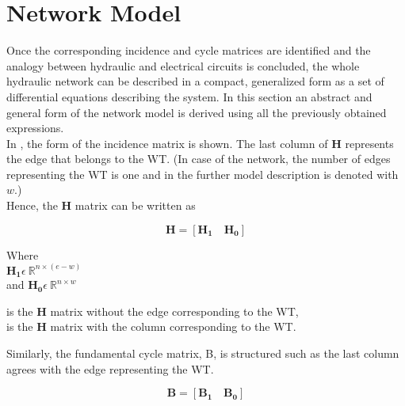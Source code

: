 \section{Network Model}  
\label{ParameterEstimation}
Once the corresponding incidence and cycle matrices are identified and the analogy between hydraulic and electrical circuits is concluded, the whole hydraulic network can be described in a compact, generalized form as a set of differential equations describing the system. In this section an abstract and general form of the network model is derived using all the previously obtained expressions. 
\\
In , the form of the incidence matrix is shown. The last column of $\pmb{H}$ represents the edge that belongs to the WT. (In case of the network, the number of edges representing the WT is one and in the further model description is denoted with $w$.) 
\\
Hence, the $\pmb{H}$ matrix can be written as 

\begin {equation}
\pmb{H} = [\pmb{H_1} \quad \pmb{H_0}]
\label{Hmatrix}
\end{equation}

\begin{minipage}[t]{0.18\textwidth}
Where\\
\hspace*{8mm} $\pmb{H_1} \epsilon \: \mathbb{R}^{n \times (e-w)}$  \\
and \hspace*{0.4mm} $\pmb{H_0} \epsilon \: \mathbb{R}^{n \times w} $ 
\end{minipage}
\begin{minipage}[t]{0.70\textwidth}
\vspace*{2mm}
\hspace*{4mm} is the $\pmb{H}$ matrix without the edge corresponding to the WT,\\
\hspace*{4mm} is the $\pmb{H}$ matrix with the column corresponding to the WT. 
\end{minipage}

Similarly, the fundamental cycle matrix, B, is structured such as the last column agrees with the edge representing the WT.

\begin{equation}
  \pmb{B} = [\pmb{B_1} \quad \pmb{B_0}]
\end{equation} 

